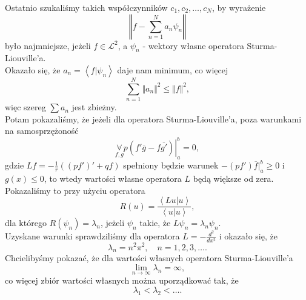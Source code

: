 \documentclass[../main.tex]{subfiles}
\begin{document}
		Ostatnio szukaliśmy takich współczynników $c_1,c_2,\ldots,c_N$, by wyrażenie
		\[
				\left\Vert f - \sum_{n=1}^{N} a_n\psi_n \right\Vert
		\]
		było najmniejsze, jeżeli $f\in \mathcal{L}^2$, a $\psi_n$ - wektory własne operatora Sturma-Liouville'a.\\
		Okazało się, że $a_n = \left<f|\psi_n \right>$ daje nam minimum, co więcej
		\[
		\sum_{n=1}^{N} \Vert a_n \Vert ^2 \le \Vert f \Vert ^2
		,\]
		więc szereg $\sum a_n$ jest zbieżny.\\
		Potam pokazaliśmy, że jeżeli dla operatora Sturma-Liouville'a, poza warunkami na samosprzężoność
		\[
				\underset{f,g}{\forall} \left.p\left( f' \overline{g} - f \overline{g'}  \right)\right|_a^b = 0
		,\]
		gdzie $Lf = -\frac{1}{r}\left( \left( pf' \right) ' + qf \right) $ spełniony będzie warunek $-\left( pf' \right) \overline{f} |_a^b \ge 0$ i $g(x) \le 0$, to wtedy wartości własne operatora $L$ będą większe od zera. Pokazaliśmy to przy użyciu operatora
		\[
				R(u) = \frac{\left<Lu|u \right>}{\left<u|u \right>}
		,\]
		dla którego $R(\psi_n) = \lambda_n$, jeżeli $\psi_n$ takie, że $L\psi_n = \lambda_n \psi_n$.\\
		Uzyskane warunki sprawdziliśmy dla operatora $L = -\frac{d^2}{dx^2}$ i okazało się, że
		\[
		\lambda_n = n^2 \pi^2,\quad n = 1,2,3,\ldots
		.\]
		Chcielibyśmy pokazać, że dla wartości własnych operatora Sturma-Liouville'a
		\[
		\lim_{n \to \infty}\lambda_n = \infty
		,\]
		co więcej zbiór wartości własnych można uporządkować tak, że
		\[
		\lambda_1 < \lambda_2 < \ldots
		.\]
\end{document}
